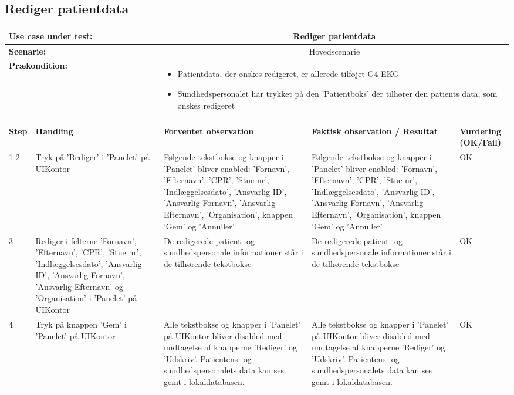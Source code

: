 \subsection{Rediger patientdata}
\begin{tabular}{|p{1cm}|p{3cm}|p{4cm}|p{4cm}|p{2cm}|}
\hline
\multicolumn{2}{|p{4cm}|}{\textbf{Use case under test:}} & \multicolumn{3}{c|}{Rediger patientdata} \\\hline

\multicolumn{2}{|p{3cm}|}{\textbf{Scenarie:}} & \multicolumn{3}{c|}{Hovedscenarie} \\\hline

\multicolumn{2}{|p{3cm}|}{\textbf{Prækondition:}}  & \multicolumn{3}{l|}{\parbox{0.6\textwidth}{
\begin{itemize}[label=$\circ$]
\item Patientdata, der ønskes redigeret, er allerede tilføjet G4-EKG 
\item Sundhedspersonalet har trykket på den 'Patientboks' der tilhører den patients data, som ønskes redigeret
\end{itemize} }}\\\hline

\multicolumn{5}{|c|}{} \\\hline

\textbf{Step} & \textbf{Handling} & \textbf{Forventet observation} & \textbf{Faktisk observation / Resultat} & \textbf{Vurdering (OK/Fail)}\\\hline

1-2 & Tryk på 'Rediger' i 'Panelet' på UIKontor & Følgende tekstbokse og knapper i 'Panelet' bliver enabled: 'Fornavn', 'Efternavn', 'CPR', 'Stue nr', 'Indlæggelsesdato', 'Ansvarlig ID', 'Ansvarlig Fornavn', 'Ansvarlig Efternavn', 'Organisation', knappen 'Gem' og 'Annuller' & Følgende tekstbokse og knapper i 'Panelet' bliver enabled: 'Fornavn', 'Efternavn', 'CPR', 'Stue nr', 'Indlæggelsesdato', 'Ansvarlig ID', 'Ansvarlig Fornavn', 'Ansvarlig Efternavn', 'Organisation', knappen 'Gem' og 'Annuller' & OK \\\hline
3 & Rediger i felterne 'Fornavn', 'Efternavn', 'CPR', 'Stue nr', 'Indlæggelsesdato', 'Ansvarlig ID', 'Ansvarlig Fornavn', 'Ansvarlig Efternavn' og 'Organisation' i 'Panelet' på UIKontor & De redigerede patient- og sundhedspersonale informationer står i de tilhørende tekstbokse & De redigerede patient- og sundhedspersonale informationer står i de tilhørende tekstbokse & OK \\\hline

4 & Tryk på knappen 'Gem' i 'Panelet' på UIKontor & Alle tekstbokse og knapper i 'Panelet' på UIKontor bliver disabled med undtagelse af knapperne 'Rediger' og 'Udskriv'. Patientens- og sundhedspersonalets data kan ses gemt i lokaldatabasen. & Alle tekstbokse og knapper i 'Panelet' på UIKontor bliver disabled med undtagelse af knapperne 'Rediger' og 'Udskriv'. Patientens- og sundhedspersonalets data kan ses gemt i lokaldatabasen. & OK \\\hline

\end{tabular}
\\

